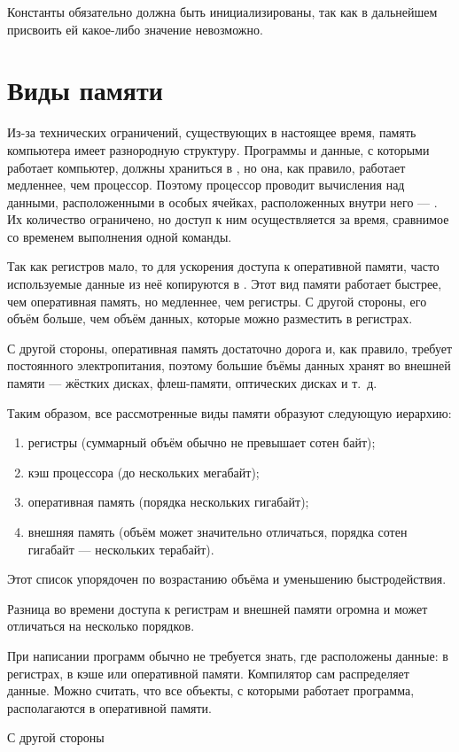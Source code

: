 Константы обязательно должна быть инициализированы, так как в
дальнейшем присвоить ей какое-либо значение невозможно.

\section{Виды памяти}

Из-за технических ограничений, существующих в настоящее время, память
компьютера имеет разнородную структуру. Программы и данные, с которыми
работает компьютер, должны храниться в , но она, как правило, работает
медленнее, чем процессор. Поэтому процессор проводит вычисления над
данными, расположенными в особых ячейках, расположенных внутри него —
. Их количество ограничено, но
доступ к ним осуществляется за время, сравнимое со временем выполнения
одной команды.

Так как регистров мало, то для ускорения доступа к оперативной памяти,
часто используемые данные из неё копируются в .  Этот вид памяти работает быстрее, чем
оперативная память, но медленнее, чем регистры. С другой стороны, его
объём больше, чем объём данных, которые можно разместить в регистрах.

С другой стороны, оперативная память достаточно дорога и, как правило,
требует постоянного электропитания, поэтому большие бъёмы данных
хранят во внешней памяти — жёстких дисках, флеш-памяти, оптических
дисках и т.~д.

Таким образом, все рассмотренные виды памяти образуют следующую иерархию:
\begin{enumerate}
\item регистры (суммарный объём обычно не превышает сотен байт);
\item кэш процессора (до нескольких мегабайт);
\item оперативная память (порядка нескольких гигабайт);
\item внешняя память (объём может значительно отличаться, порядка
  сотен гигабайт — нескольких терабайт).
\end{enumerate}

Этот список упорядочен по возрастанию объёма и уменьшению быстродействия.

Разница во времени доступа к регистрам и внешней памяти огромна и
может отличаться на несколько порядков.

При написании программ обычно не требуется знать, где расположены
данные: в регистрах, в кэше или оперативной памяти. Компилятор сам
распределяет данные. Можно считать, что все объекты, с которыми
работает программа, располагаются в оперативной памяти.

С другой стороны
